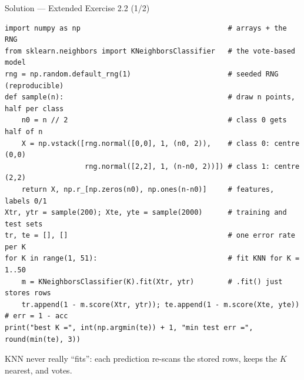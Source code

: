 \documentclass[aspectratio=169,11pt]{beamer}
\begin{document}
\begin{frame}[fragile]{Solution --- Extended Exercise 2.2 (1/2)}
\begin{solutionbox}
\begin{lstlisting}[basicstyle=\ttfamily\scriptsize]
import numpy as np                                   # arrays + the RNG
from sklearn.neighbors import KNeighborsClassifier   # the vote-based model
rng = np.random.default_rng(1)                       # seeded RNG (reproducible)
def sample(n):                                       # draw n points, half per class
    n0 = n // 2                                      # class 0 gets half of n
    X = np.vstack([rng.normal([0,0], 1, (n0, 2)),    # class 0: centre (0,0)
                   rng.normal([2,2], 1, (n-n0, 2))]) # class 1: centre (2,2)
    return X, np.r_[np.zeros(n0), np.ones(n-n0)]     # features, labels 0/1
Xtr, ytr = sample(200); Xte, yte = sample(2000)      # training and test sets
tr, te = [], []                                      # one error rate per K
for K in range(1, 51):                               # fit KNN for K = 1..50
    m = KNeighborsClassifier(K).fit(Xtr, ytr)        # .fit() just stores rows
    tr.append(1 - m.score(Xtr, ytr)); te.append(1 - m.score(Xte, yte))  # err = 1 - acc
print("best K =", int(np.argmin(te)) + 1, "min test err =", round(min(te), 3))
\end{lstlisting}
\smallskip
{\scriptsize KNN never really ``fits'': each prediction re-scans the stored rows, keeps the $K$ nearest, and votes.}
\end{solutionbox}
\end{frame}
\end{document}
